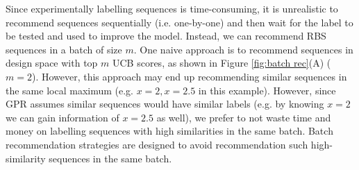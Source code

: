 Since experimentally labelling sequences is time-consuming, it is unrealistic to recommend sequences sequentially (i.e. one-by-one) and then wait for the label to be tested and used to improve the model.
Instead, we can recommend RBS sequences in a batch of size $m$. 
One naive approach is to 
recommend sequences in design space with top $m$ UCB scores, as shown in Figure \ref{fig:batch rec}(A) ($m = 2$).
However, this approach may end up recommending similar sequences in the same local maximum (e.g. $x = 2, x =2.5$ in this example). 
However, since GPR assumes similar sequences would have similar labels (e.g. by knowing $x=2$ we can gain information of $x=2.5$ as well), we prefer to not waste time and money on labelling sequences with high similarities in the same batch.
Batch recommendation strategies are designed to avoid recommendation such high-similarity sequences in the same batch. 


